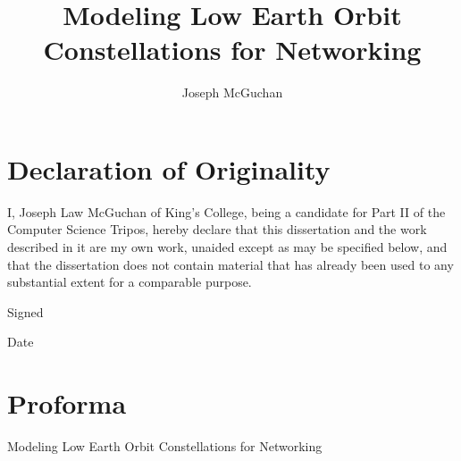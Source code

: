 \documentclass[12pt]{report}
\begin{document}
\title{Modeling Low Earth Orbit Constellations for Networking}
\author{Joseph McGuchan}
\maketitle
\thispagestyle{empty}





\chapter{Declaration of Originality}

I, Joseph Law McGuchan of King's College, being a candidate for Part II of the Computer Science Tripos, hereby declare that this dissertation and the work described in it are my own work, unaided except as may be specified below, and that the dissertation does not contain material that has already been used to any substantial extent for a comparable purpose.

Signed %

Date %

\chapter{Proforma}


Modeling Low Earth Orbit Constellations for Networking

\tableofcontents

\end{document}
